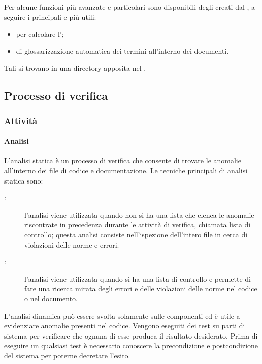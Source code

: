 \documentclass[a4paper, titlepage]{article}
\begin{document}
Per alcune funzioni più avanzate e particolari sono disponibili degli  creati dal , a seguire i principali e più utili:
\begin{itemize}
	\item {} per calcolare l';
	\item {} di glossarizzazione automatica dei termini all'interno dei documenti.
\end{itemize}
Tali  si trovano in una directory apposita nel .

\newpage

\subsection{Processo di verifica}

\subsubsection{Attività}

\paragraph{Analisi}

L'analisi statica è un processo di verifica che consente di trovare le anomalie all'interno dei file di codice e documentazione. Le tecniche principali di analisi statica sono:
\begin{description}
	\item[:] l'analisi  viene utilizzata quando non si ha una lista che elenca le anomalie riscontrate in precedenza durante le attività di verifica, chiamata lista di controllo; questa analisi consiste nell'ispezione dell'intero file in cerca di violazioni delle norme e errori.
	\item[:] l'analisi  viene utilizzata quando si ha una lista di controllo e permette di fare una ricerca mirata degli errori e delle violazioni delle norme nel codice o nel documento.
\end{description}

L'analisi dinamica può essere svolta solamente sulle componenti  ed è utile a evidenziare anomalie presenti nel codice. Vengono eseguiti dei test su parti di sistema per verificare che ognuna di esse produca il risultato desiderato. Prima di eseguire un qualsiasi test è necessario conoscere la precondizione e postcondizione del sistema per poterne decretare l'esito.
\end{document}
